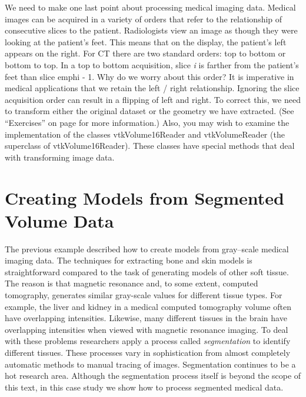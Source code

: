 We need to make one last point about processing medical imaging data. Medical images can be acquired in a variety of orders that refer to the relationship of consecutive slices to the patient. Radiologists view an image as though they were looking at the patient's feet. This means that on the display, the patient's left appears on the right. For CT there are two standard orders: top to bottom or bottom to top. In a top to bottom acquisition, slice \emph{i} is farther from the patient's feet than slice emph{i} - 1. Why do we worry about this order? It is imperative in medical applications that we retain the left / right relationship. Ignoring the slice acquisition order can result in a flipping of left and right. To correct this, we need to transform either the original dataset or the geometry we have extracted. (See ``Exercises'' on page \pageref{exercises:ch_12} for more information.) Also, you may wish to examine the implementation of the classes vtkVolume16Reader and vtkVolumeReader (the superclass of vtkVolume16Reader). These classes have special methods that deal with transforming image data.

\section{Creating Models from Segmented Volume Data}

The previous example described how to create models from gray--scale medical imaging data. The techniques for extracting bone and skin models is straightforward compared to the task of generating models of other soft tissue. The reason is that magnetic resonance and, to some extent, computed tomography, generates similar gray-scale values for different tissue types. For example, the liver and kidney in a medical computed tomography volume often have overlapping intensities. Likewise, many different tissues in the brain have overlapping intensities when viewed with magnetic resonance imaging. To deal with these problems researchers apply a process called \emph{segmentation} to identify different tissues. These processes vary in sophistication from almost completely automatic methods to manual tracing of images. Segmentation continues to be a hot research area. Although the segmentation process itself is beyond the scope of this text, in this case study we show how to process segmented medical data.

